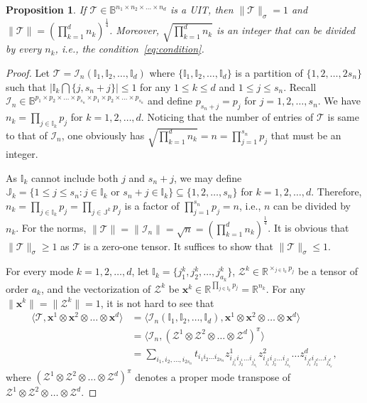 \documentclass[11pt]{article}
\newtheorem{proposition}[theorem]{Proposition}
\newcommand{\BB}{\mathbb{B}}
\newcommand{\R}{\mathbb{R}}
\newcommand{\BI}{\mathbb{I}}
\newcommand{\BJ}{\mathbb{J}}
\newcommand{\Z}{\mathcal{Z}}
\newcommand{\II}{\mathcal{I}}
\newcommand{\TT}{\mathcal{T}}
\newcommand{\bx}{\boldsymbol{x}}
\begin{document}
\begin{proposition}\label{thm:uit}
If $\TT\in\BB^{n_1\times n_2\times \dots \times n_d}$ is a UIT, then $\|\TT\|_\sigma=1$ and $\|\TT\|=\left(\prod_{k=1}^dn_k\right)^{\frac{1}{4}}$. Moreover, $\sqrt{\prod_{k=1}^dn_k}$ is an integer that can be divided by every $n_k$, i.e., the condition~\eqref{eq:condition}.
\end{proposition}
\begin{proof}
Let $\TT=\II_n(\BI_1,\BI_2,\dots,\BI_d)$ where $\{\BI_1,\BI_2,\dots,\BI_d\}$ is a partition of $\{1,2,\dots,2s_n\}$ such that $\left|\BI_k\bigcap\{j,s_n+j\}\right|\le1$ for any $1\le k\le d$ and $1\le j\le s_n$. Recall $\II_n\in\BB^{p_1\times p_2\times \dots \times p_{s_n}\times p_1 \times p_2\times\dots\times p_{s_n}}$ and define $p_{s_n+j}=p_{j}$ for $j=1,2,\dots,s_n$. We have $n_k=\prod_{j\in\BI_k}p_j$ for $k=1,2,\dots,d$. Noticing that the number of entries of $\TT$ is same to that of $\II_n$, one obviously has $\sqrt{\prod_{k=1}^dn_k}=n=\prod_{j=1}^{s_n}p_j$ that must be an integer.

As $\BI_k$ cannot include both $j$ and $s_n+j$, we may define $\BJ_k=\{1\le j\le s_n: j\in\BI_k\mbox{ or } s_n+j\in\BI_k\}\subseteq\{1,2,\dots,s_n\}$ for $k=1,2,\dots,d$. Therefore, $n_k=\prod_{j\in\BI_k}p_j=\prod_{j\in\BJ^k}p_j$ is a factor of $\prod_{j=1}^{s_n} p_j=n$, i.e., $n$ can be divided by $n_k$. For the norms, $\|\TT\|=\|\II_n\|=\sqrt{n}=\left(\prod_{k=1}^dn_k\right)^{\frac{1}{4}}$. It is obvious that $\|\TT\|_\sigma\ge1$ as $\TT$ is a zero-one tensor. It suffices to show that $\|\TT\|_\sigma\le1$.

For every mode $k=1,2,\dots,d$, let $\BI_k=\{j^k_1,j^k_2,\dots,j^k_{a_k}\}$, $\Z^k\in\R^{\times_{j\in\BI_k}p_j}$ be a tensor of order $a_k$, and the vectorization of $\Z^k$ be $\bx^k\in\R^{\prod_{j\in\BI_k}p_j}=\R^{n_k}$. For any $\|\bx^k\|=\|\Z^k\|=1$, it is not hard to see that
\begin{align}
\langle \TT,\bx^1\otimes\bx^2\otimes\dots\otimes \bx^d \rangle
&=\langle \II_n(\BI_1, \BI_2,\dots, \BI_d),\bx^1\otimes\bx^2\otimes\dots\otimes \bx^d \rangle \nonumber \\
&=\langle \II_n,(\Z^1\otimes\Z^2\otimes\dots\otimes \Z^d)^\pi \rangle\nonumber \\
&=\sum_{i_1,i_2,\dots,i_{2s_n}} t_{i_1i_2\dots i_{2s_n}} z^{1}_{i_{j^1_1} i_{j^1_2}\dots i_{j^1_{a_1}}} z^{2}_{i_{j^2_1} i_{j^2_2}\dots i_{j^2_{a_2}}} \dots z^{d}_{i_{j^d_1} i_{j^d_2} \dots i_{j^d_{a_d}}}, \label{eq:summand}
\end{align}
where $\left(\Z^1\otimes\Z^2\otimes\dots\otimes \Z^d\right)^\pi$ denotes a proper mode transpose of $\Z^1\otimes\Z^2\otimes\dots\otimes \Z^d$.


\end{proof}
\end{document}

